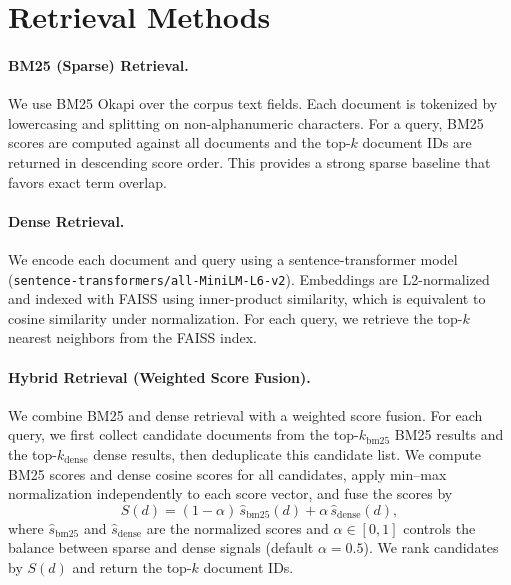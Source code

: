 \section{Retrieval Methods}
\label{sec:retrieval_methods}

\paragraph{BM25 (Sparse) Retrieval.}
We use BM25 Okapi over the corpus text fields. Each document is tokenized by lowercasing and splitting on non-alphanumeric characters. For a query, BM25 scores are computed against all documents and the top-$k$ document IDs are returned in descending score order. This provides a strong sparse baseline that favors exact term overlap.

\paragraph{Dense Retrieval.}
We encode each document and query using a sentence-transformer model (\texttt{sentence-transformers/all-MiniLM-L6-v2}). Embeddings are L2-normalized and indexed with FAISS using inner-product similarity, which is equivalent to cosine similarity under normalization. For each query, we retrieve the top-$k$ nearest neighbors from the FAISS index.

\paragraph{Hybrid Retrieval (Weighted Score Fusion).}
We combine BM25 and dense retrieval with a weighted score fusion. For each query, we first collect candidate documents from the top-$k_{\text{bm25}}$ BM25 results and the top-$k_{\text{dense}}$ dense results, then deduplicate this candidate list. We compute BM25 scores and dense cosine scores for all candidates, apply min--max normalization independently to each score vector, and fuse the scores by
\begin{equation}
\label{eq:hybrid_fusion}
S(d) = (1-\alpha)\,\hat{s}_{\text{bm25}}(d) + \alpha\,\hat{s}_{\text{dense}}(d),
\end{equation}
where $\hat{s}_{\text{bm25}}$ and $\hat{s}_{\text{dense}}$ are the normalized scores and $\alpha \in [0,1]$ controls the balance between sparse and dense signals (default $\alpha=0.5$). We rank candidates by $S(d)$ and return the top-$k$ document IDs.
